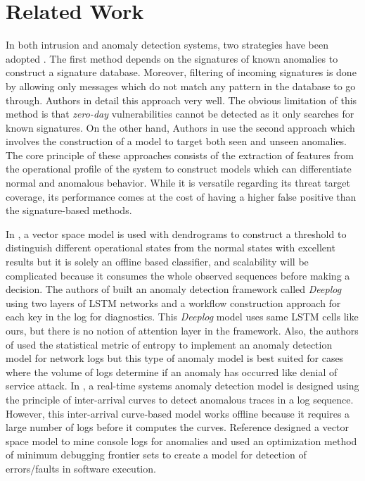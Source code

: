 \section{Related Work}
\label{sec:related-work}
In both intrusion and anomaly detection systems, two strategies have been 
adopted \cite{chandola2009anomaly}. The first method depends on the signatures 
of known anomalies to construct a signature database. Moreover, filtering of 
incoming signatures is done by allowing only messages which do not match any 
pattern in the database to go through. Authors in \cite{garcia2009anomaly} 
detail this approach very well. The obvious limitation of this method is that 
\emph{zero-day} vulnerabilities cannot be detected as it only searches for 
known signatures. On the other hand, Authors in 
\cite{ezeme2017imputation,du2017deeplog,xu2009largescale,yu2016cloudseer} use 
the second approach which involves the construction of a model to target both 
seen and unseen anomalies. The core principle of these approaches consists of 
the extraction of features from the operational profile of the system to 
construct models which can differentiate normal and anomalous behavior. While 
it is versatile regarding its threat target coverage, its performance comes at 
the cost of having a higher false positive than the signature-based methods. 
\par 
In \cite{ezeme2017imputation}, a vector space model is used with dendrograms to 
construct a threshold to distinguish different operational states from the 
normal states with excellent results but it is solely an offline based 
classifier, and scalability will be complicated because it consumes the whole 
observed sequences before making a decision. The authors of 
\cite{du2017deeplog} built an anomaly detection framework called \emph{Deeplog} 
using two layers of LSTM networks and a workflow construction approach for each 
key in the log for diagnostics. This \emph{Deeplog} model uses same LSTM cells 
like ours, but there is no notion of attention layer in the framework. Also, 
the authors of \cite{gu2005detecting} used the statistical metric of entropy to 
implement an anomaly detection model for network logs but this type of anomaly 
model is best suited for cases where the volume of logs determine if an anomaly 
has occurred like denial of service attack. In \cite{salem2016anomaly}, a 
real-time systems anomaly detection model is designed using the principle of 
inter-arrival curves to detect anomalous traces in a log sequence. However, 
this inter-arrival curve-based model works offline because it requires a 
large number of logs before it computes the curves. Reference 
\cite{xu2009largescale} designed a vector space model to mine console logs for 
anomalies and \cite{li2017locating} used an optimization method of minimum 
debugging frontier sets to create a model for detection of errors/faults in 
software execution.

